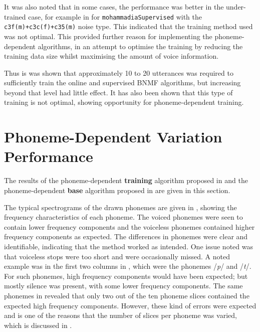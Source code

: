 It was also noted that in some cases, the performance was better in
the under-trained case, for example in  for
\lstinline!mohammadiaSupervised! with the\linebreak{}
\lstinline!c3f(m)+c3c(f)+c35(m)! noise type. This indicated that
the training method used was not optimal. This provided further reason
for implementing the phoneme-dependent algorithms, in an attempt to
optimise the training by reducing the training data size whilst maximising
the amount of voice information.

Thus is was shown that approximately 10 to 20 utterances was required
to sufficiently train the online and supervised \ac{BNMF} algorithms,
but increasing beyond that level had little effect. It has also been
shown that this type of training is not optimal, showing opportunity
for phoneme-dependent training.

\clearpage{}


\section{Phoneme-Dependent Variation Performance}

The results of the phoneme-dependent \textbf{training} algorithm proposed
in  and the phoneme-dependent \textbf{base}
algorithm proposed in  are given in this
section.

The typical spectrograms of the drawn phonemes are given in ,
showing the frequency characteristics of each phoneme. The voiced
phonemes were seen to contain lower frequency components and the voiceless
phonemes contained higher frequency components as expected. The differences
in phonemes were clear and identifiable, indicating that the method
worked as intended. One issue noted was that voiceless stops were
too short and were occasionally missed. A noted example was in the
first two columns in , which were the
phonemes /\textit{p}/ and /\textit{t}/. For such phonemes, high frequency
components would have been expected; but mostly silence was present,
with some lower frequency components. The same phonemes in 
revealed that only two out of the ten phoneme slices contained the
expected high frequency components. However, these kind of errors
were expected and is one of the reasons that the number of slices
per phoneme was varied, which is discussed in .

